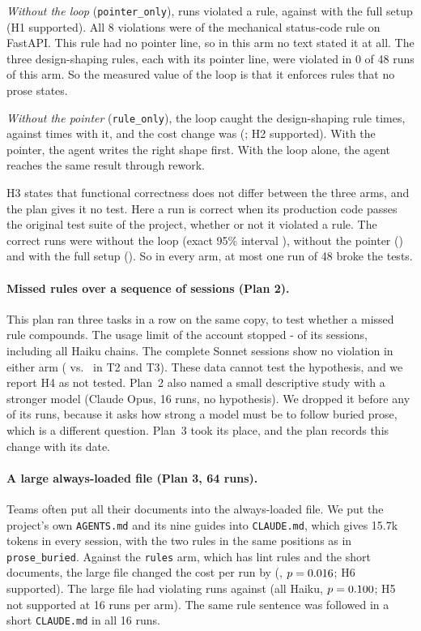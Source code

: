\documentclass[pdflatex,sn-basic]{sn-jnl}
\newcommand{\file}[1]{\texttt{#1}}
\newcommand{\arm}[1]{\texttt{#1}}
\begin{document}
\emph{Without the loop} (\arm{pointer\_only}), \HOneBreaks{} runs violated a rule, against \HOneBreaksAgainst{} with the full setup (H1 supported).
All 8 violations were of the mechanical status-code rule on FastAPI.
This rule had no pointer line, so in this arm no text stated it at all.
The three design-shaping rules, each with its pointer line, were violated in 0 of 48 runs of this arm.
So the measured value of the loop is that it enforces rules that no prose states.

\emph{Without the pointer} (\arm{rule\_only}), the loop caught the design-shaping rule \HTwoCatchNoPointer{} times, against \HOneCatchFull{} times with it, and the cost change was \HTwoCost{} (\HTwoCI; H2 supported).
With the pointer, the agent writes the right shape first.
With the loop alone, the agent reaches the same result through rework.

H3 states that functional correctness does not differ between the three arms, and the plan gives it no test.
Here a run is correct when its production code passes the original test suite of the project, whether or not it violated a rule.
The correct runs were \HThreeNoLoop{} without the loop (exact 95\% interval \HThreeNoLoopCI), \HThreeNoPointer{} without the pointer (\HThreeNoPointerCI) and \HThreeFull{} with the full setup (\HThreeFullCI).
So in every arm, at most one run of 48 broke the tests.

\paragraph{Missed rules over a sequence of sessions (Plan 2).}
This plan ran three tasks in a row on the same copy, to test whether a missed rule compounds.
The usage limit of the account stopped \the\numexpr\SeqPlanned-\SeqOk\relax{} of its \SeqPlanned{} sessions, including all Haiku chains.
The complete Sonnet sessions show no violation in either arm (\HFourBreaks{} vs.\ \HFourBreaksAgainst{} in T2 and T3).
These data cannot test the hypothesis, and we report H4 as not tested.
Plan~2 also named a small descriptive study with a stronger model (Claude Opus, 16 runs, no hypothesis).
We dropped it before any of its runs, because it asks how strong a model must be to follow buried prose, which is a different question.
Plan~3 took its place, and the plan records this change with its date.

\paragraph{A large always-loaded file (Plan 3, 64 runs).}
Teams often put all their documents into the always-loaded file.
We put the project's own \file{AGENTS.md} and its nine guides into \file{CLAUDE.md}, which gives 15.7k tokens in every session, with the two rules in the same positions as in \arm{prose\_buried}.
Against the \arm{rules} arm, which has lint rules and the short documents, the large file changed the cost per run by \HSixCost{} (\HSixCI, $p=0.016$; H6 supported).
The large file had \HFiveBreaks{} violating runs against \HFiveBreaksAgainst{} (all Haiku, $p=0.100$; H5 not supported at 16 runs per arm).
The same rule sentence was followed in a short \file{CLAUDE.md} in all 16 runs.
\end{document}
